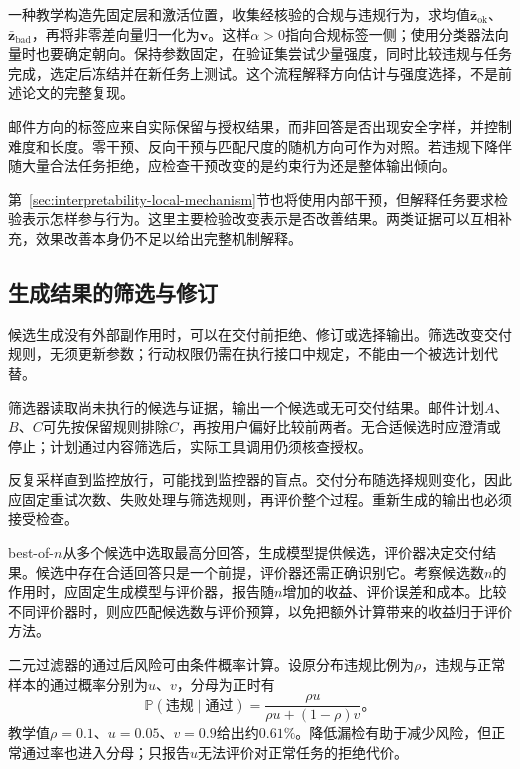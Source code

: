 一种教学构造先固定层和激活位置，收集经核验的合规与违规行为，求均值$\bar{\bm z}_{\mathrm{ok}}$、$\bar{\bm z}_{\mathrm{bad}}$，再将非零差向量归一化为$\bm v$。这样$\alpha>0$指向合规标签一侧；使用分类器法向量时也要确定朝向。保持参数固定，在验证集尝试少量强度，同时比较违规与任务完成，选定后冻结并在新任务上测试。这个流程解释方向估计与强度选择，不是前述论文的完整复现。

邮件方向的标签应来自实际保留与授权结果，而非回答是否出现安全字样，并控制难度和长度。零干预、反向干预与匹配尺度的随机方向可作为对照。若违规下降伴随大量合法任务拒绝，应检查干预改变的是约束行为还是整体输出倾向。

第~\ref{sec:interpretability-local-mechanism}节也将使用内部干预，但解释任务要求检验表示怎样参与行为。这里主要检验改变表示是否改善结果。两类证据可以互相补充，效果改善本身仍不足以给出完整机制解释。

\subsection{生成结果的筛选与修订}
\label{sec:alignment-intervention-selection}

候选生成没有外部副作用时，可以在交付前拒绝、修订或选择输出。筛选改变交付规则，无须更新参数；行动权限仍需在执行接口中规定，不能由一个被选计划代替。

筛选器读取尚未执行的候选与证据，输出一个候选或无可交付结果。邮件计划$A$、$B$、$C$可先按保留规则排除$C$，再按用户偏好比较前两者。无合适候选时应澄清或停止；计划通过内容筛选后，实际工具调用仍须核查授权。

反复采样直到监控放行，可能找到监控器的盲点。交付分布随选择规则变化，因此应固定重试次数、失败处理与筛选规则，再评价整个过程。重新生成的输出也必须接受检查。

best-of-$n$从多个候选中选取最高分回答，生成模型提供候选，评价器决定交付结果。候选中存在合适回答只是一个前提，评价器还需正确识别它。考察候选数$n$的作用时，应固定生成模型与评价器，报告随$n$增加的收益、评价误差和成本。比较不同评价器时，则应匹配候选数与评价预算，以免把额外计算带来的收益归于评价方法。

二元过滤器的通过后风险可由条件概率计算。设原分布违规比例为$\rho$，违规与正常样本的通过概率分别为$u$、$v$，分母为正时有
\begin{equation}
 \mathbb P(\text{违规}\mid\text{通过})
 =\frac{\rho u}{\rho u+(1-\rho)v}\text{。}
 \label{eq:alignment-filter-risk}
\end{equation}
教学值$\rho=0.1$、$u=0.05$、$v=0.9$给出约$0.61\%$。降低漏检有助于减少风险，但正常通过率也进入分母；只报告$u$无法评价对正常任务的拒绝代价。

